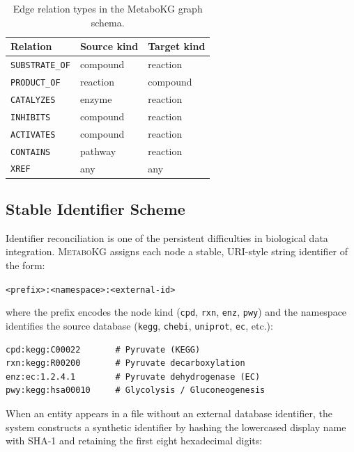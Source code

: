 \documentclass[10pt]{article}
\begin{document}
\begin{table}[H]
  \centering
  \caption{Edge relation types in the MetaboKG graph schema.}
  \label{tab:relations}
  \small
  \begin{tabular}{@{}lll@{}}
    \toprule
    Relation & Source kind & Target kind \\
    \midrule
    \texttt{SUBSTRATE\_OF}  & compound  & reaction  \\
    \texttt{PRODUCT\_OF}    & reaction  & compound  \\
    \texttt{CATALYZES}      & enzyme    & reaction  \\
    \texttt{INHIBITS}       & compound  & reaction  \\
    \texttt{ACTIVATES}      & compound  & reaction  \\
    \texttt{CONTAINS}       & pathway   & reaction  \\
    \texttt{XREF}           & any       & any       \\
    \bottomrule
  \end{tabular}
\end{table}

\subsection{Stable Identifier Scheme}

Identifier reconciliation is one of the persistent difficulties in biological
data integration. \textsc{MetaboKG} assigns each node a stable, URI-style
string identifier of the form:

\begin{center}
\texttt{<prefix>:<namespace>:<external-id>}
\end{center}

\noindent where the prefix encodes the node kind (\texttt{cpd}, \texttt{rxn},
\texttt{enz}, \texttt{pwy}) and the namespace identifies the source database
(\texttt{kegg}, \texttt{chebi}, \texttt{uniprot}, \texttt{ec}, etc.):

\begin{lstlisting}[style=python, caption={Examples of stable node identifiers.}]
cpd:kegg:C00022       # Pyruvate (KEGG)
rxn:kegg:R00200       # Pyruvate decarboxylation
enz:ec:1.2.4.1        # Pyruvate dehydrogenase (EC)
pwy:kegg:hsa00010     # Glycolysis / Gluconeogenesis
\end{lstlisting}

When an entity appears in a file without an external database identifier, the
system constructs a synthetic identifier by hashing the lowercased display name
with SHA-1 and retaining the first eight hexadecimal digits:
\end{document}
